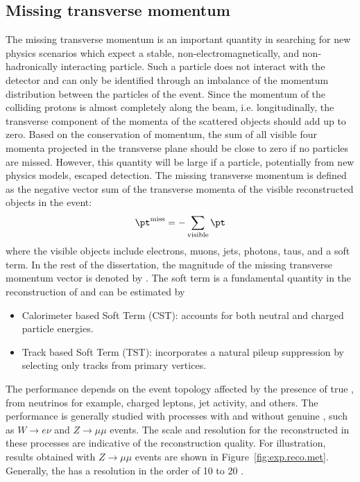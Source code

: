 \subsection{Missing transverse momentum}
The missing transverse momentum is an important quantity in searching for new physics scenarios which expect a stable, 
non-electromagnetically, and non-hadronically interacting 
particle. Such a particle does not interact with the detector and can only be identified through an imbalance of the momentum 
distribution between the particles 
of the event. 
Since the momentum of the colliding protons is almost completely along the beam, i.e. longitudinally, 
the transverse component of the momenta of the 
scattered objects should add up to zero.
Based on the conservation of momentum, the sum of all visible four momenta projected in the transverse plane should be close to zero if 
no particles are missed.
However, this quantity will be large if a particle, potentially from new physics models, escaped detection. 
The missing transverse momentum is defined as the negative vector sum of the transverse momenta of the visible reconstructed objects in the
 event: 
\begin{equation}
\pt^{\rm{miss}} = - \sum_\text{visible} \pt
\end{equation}
where the visible objects include electrons, muons, jets, photons, taus, and a soft term.
In the rest of the dissertation, the magnitude of the missing transverse momentum vector is denoted by \met.
The soft term  is  a fundamental quantity in the reconstruction of \met and can be estimated by 
\begin{itemize}
\item Calorimeter based Soft Term (CST): accounts for both neutral and charged particle energies.
\item Track based Soft Term (TST): incorporates a natural pileup suppression by selecting only tracks from primary vertices.
\end{itemize}

The \met performance depends on the event topology affected by the presence of true \met, from neutrinos for example,
charged leptons, jet activity, and others.
The \met performance is generally studied with processes with and without genuine \met, such as 
$W \to e \nu$ and $Z\to\mu\mu$ events. 
The scale and resolution for the reconstructed \met in these processes are indicative of the reconstruction quality.
For illustration, results obtained with  $Z\to\mu\mu$ events are shown in Figure~\ref{fig:exp.reco.met}.
Generally, the \met has a resolution in the order of 10 to 20 \GeV.


